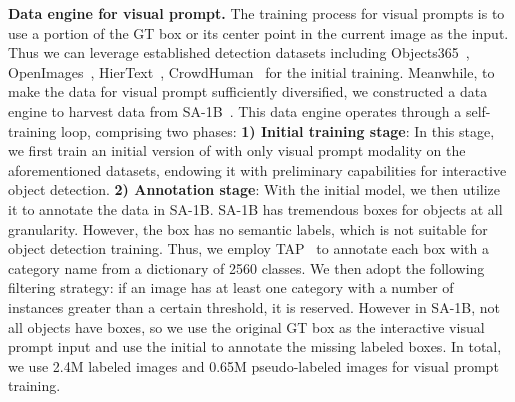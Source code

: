 \noindent\textbf{Data engine for visual prompt.} The training process for visual prompts is to use a portion of the GT box or its center point in the current image as the input. Thus we can leverage established detection datasets including Objects365~\cite{shao2019objects365}, OpenImages~\cite{krasin2017openimages}, HierText~\cite{long2022towards}, CrowdHuman~\cite{shao2018crowdhuman} for the initial training. Meanwhile, to make the data for visual prompt sufficiently diversified, we constructed a data engine to harvest data from SA-1B~\cite{kirillov2023segment}.  This data engine operates through a self-training loop, comprising two phases: \textbf{1) Initial training stage}: In this stage, we first train an initial version of \ourmodel{} with only visual prompt modality on the aforementioned datasets, endowing it with preliminary capabilities for interactive object detection. \textbf{2) Annotation stage}: With the initial model, we then utilize it to annotate the data in SA-1B. SA-1B has tremendous boxes for objects at all granularity. However, the box has no semantic labels, which is not suitable for object detection training. Thus, we employ TAP~\cite{pan2023tokenize} to annotate each box with a category name from a dictionary of 2560 classes. We then adopt the following filtering strategy: if an image has at least one category with a number of instances greater than a certain threshold, it is reserved. However in SA-1B, not all objects have boxes, so we use the original GT box as the interactive visual prompt input and use the initial \ourmodel{} to annotate the missing labeled boxes. In total, we use 2.4M labeled images and 0.65M pseudo-labeled images for visual prompt training.



